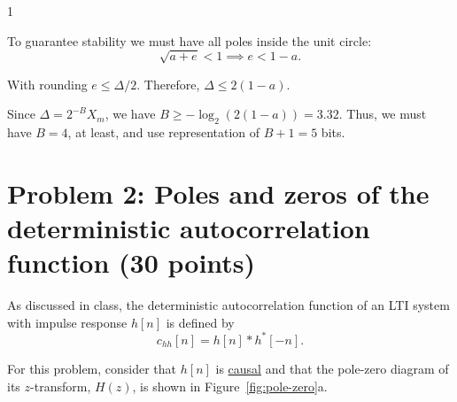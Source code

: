 \documentclass[10pt]{article}
\def\SOLUTIONS{1} %
\def\SolutionsColor{red2}
\begin{document}
\begin{description}
\if\SOLUTIONS1
{\color{\SolutionsColor} To guarantee stability we must have all poles inside the unit circle:
\begin{equation*}
\sqrt{a + e} < 1 \implies e < 1 - a.
\end{equation*}

With rounding $e \leq \Delta/2$. Therefore, $\Delta \leq 2(1-a)$.

Since $\Delta = 2^{-B}X_m$, we have $B \geq -\log_2(2(1-a)) = 3.32$. Thus, we must have $B = 4$, at least, and use representation of $B+1 = 5$ bits.
}
\else\vspace{4cm}
\fi

\end{description}
\newpage

\section*{Problem 2: Poles and zeros of the deterministic autocorrelation function (30 points)}
As discussed in class, the deterministic autocorrelation function of an LTI system with impulse response $h[n]$ is defined by
\begin{equation}
c_{hh}[n] = h[n] \ast h^*[-n].
\end{equation}

For this problem, consider that $h[n]$ is \underline{causal} and that the pole-zero diagram of its $z$-transform, $H(z)$, is shown in Figure~\ref{fig:pole-zero}a.
\end{document}
